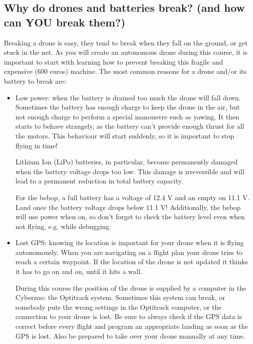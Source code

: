 \documentclass{article}
\begin{document}
\subsection*{Why do drones and batteries break? (and how can YOU break them?)}
Breaking a drone is easy, they tend to break when they fall on the ground, or get stuck in the net. As you will create an autonomous drone during this course, it is important to start with learning how to prevent breaking this fragile and expensive (600 euros) machine. The most common reasons for a drone and/or its battery to break are:
\begin{itemize}
\item Low power: when the battery is drained too much the drone will fall down. Sometimes the battery has enough charge to keep the drone in the air, but not enough charge to perform a special manouevre such as yawing. It then starts to behave strangely, as the battery can't provide enough thrust for all the motors. This behaviour will start suddenly, so it is important to stop flying in time!

Lithium Ion (LiPo) batteries, in particular, become permanently damaged when the battery voltage drops too low. This damage is irreversible and will lead to a permanent reduction in total battery capacity.

For the bebop, a full battery has a voltage of 12.4 V and an empty on 11.1 V. Land once the battery voltage drops below 11.1 V! Additionally, the bebop will use power when on, so don't forget to check the battery level even when not flying, e.g. while debugging.


\item Lost GPS: knowing its location is important for your drone when it is flying autonomously. When you are navigating on a flight plan your drone tries to reach a certain waypoint. If the location of the drone is not updated it thinks it has to go on and on, until it hits a wall. 

During this course the position of the drone is supplied by a computer in the Cyberzoo: the Optitrack system. Sometimes this system can break, or somebody puts the wrong settings in the Optitrack computer, or the connection to your drone is lost. Be sure to always check if the GPS data is correct before every flight and program an appropriate landing as soon as the GPS is lost. Also be prepared to take over your drone manually at any time. 


\end{itemize}
\end{document}
